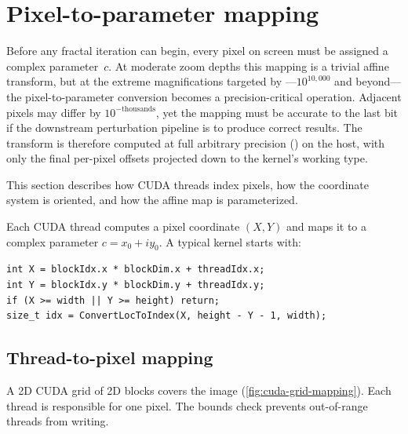 \section{Pixel-to-parameter mapping}
\label{sec:mapping}

Before any fractal iteration can begin, every pixel on screen must be
assigned a complex parameter~$c$.  At moderate zoom depths this mapping is
a trivial affine transform, but at the extreme magnifications targeted by
\FractalShark{}---$10^{10{,}000}$ and beyond---the pixel-to-parameter
conversion becomes a precision-critical operation.  Adjacent pixels may
differ by $10^{-\text{thousands}}$, yet the mapping must be accurate to
the last bit if the downstream perturbation pipeline is to produce correct
results.  The transform is therefore computed at full arbitrary precision
() on the host, with only the final per-pixel offsets
projected down to the kernel's working type.

This section describes how CUDA threads index pixels, how the coordinate
system is oriented, and how the affine map is parameterized.

Each CUDA thread computes a pixel coordinate \((X,Y)\) and maps it to a complex
parameter \(c = x_0 + i y_0\). A typical kernel starts with:
\begin{lstlisting}
int X = blockIdx.x * blockDim.x + threadIdx.x;
int Y = blockIdx.y * blockDim.y + threadIdx.y;
if (X >= width || Y >= height) return;
size_t idx = ConvertLocToIndex(X, height - Y - 1, width);
\end{lstlisting}

\subsection{Thread-to-pixel mapping}
A 2D CUDA grid of 2D blocks covers the image (\cref{fig:cuda-grid-mapping}).
Each thread is responsible for one pixel.
The bounds check prevents out-of-range threads from writing.

